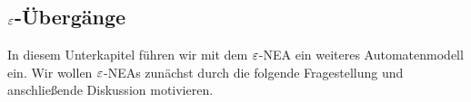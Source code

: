 %         
% 
% 







\subsection{\texorpdfstring{$\varepsilon$}{epsilon}-Übergänge}\label{sec:2.EpsNea}
In diesem Unterkapitel führen wir mit dem $\varepsilon$-NEA ein weiteres Automatenmodell ein. 
Wir wollen $\varepsilon$-NEAs zunächst durch die folgende Fragestellung und anschließende Diskussion motivieren.


